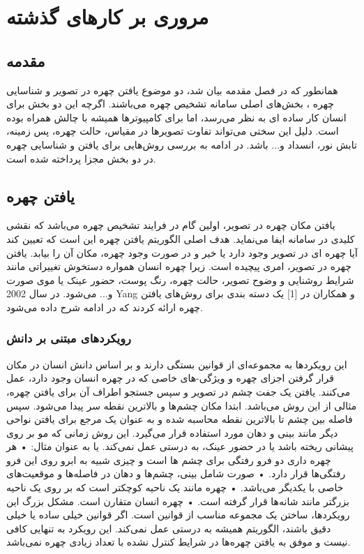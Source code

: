 \chapter{ مروری بر کارهای گذشته}

\section{مقدمه}
همانطور که در فصل مقدمه بیان شد، دو موضوع یافتن چهره  در تصویر و شناسایی چهره ، بخش‌های اصلی سامانه تشخیص چهره می‌باشند. اگرچه این دو بخش برای انسان کار ساده ای به نظر می‌رسد، اما برای کامپیوتر‌ها همیشه با چالش همراه بوده است. دلیل این سختی می‌تواند تفاوت تصویرها در مقیاس، حالت چهره، پس زمینه، تابش نور، انسداد و... باشد. در ادامه به بررسی روش‌هایی برای یافتن و شناسایی چهره در دو بخش مجزا پرداخته شده است.
\section{یافتن چهره}
یافتن مکان چهره در تصویر، اولین گام در فرایند تشخیص چهره می‌باشد که نقشی کلیدی در سامانه ایفا می‌نماید. هدف اصلی الگوریتم‌ یافتن چهره این است که تعیین کند آیا چهره ای در تصویر وجود دارد یا خیر و در صورت وجود چهره، مکان آن را بیابد. یافتن چهره در تصویر، امری پیچیده است. زیرا چهره انسان همواره دستخوش تغییراتی مانند شرایط روشنایی و وضوح تصویر، حالت چهره، رنگ پوست، حضور عینک یا موی صورت و... می‌شود. در سال 2002 Yang و همکاران در [1] یک دسته بندی برای روش‌های یافتن چهره ارائه کردند که در ادامه شرح داده می‌شود.

\subsection{رویکردهای مبتنی بر دانش}
این رویکردها به مجموعه‌ای از قوانین بستگی دارند و بر اساس دانش انسان در مکان قرار گرفتن اجزای چهره و ویژگی-های خاصی که در چهره انسان وجود دارد، عمل می‌کنند. یافتن یک جفت چشم در تصویر و سپس جستجو اطراف آن برای یافتن چهره، مثالی از این روش می‌باشد. ابتدا مکان چشم‌ها و بالاترین نقطه سر پیدا می‌شود. سپس فاصله بین چشم تا بالاترین نقطه محاسبه شده و به عنوان یک مرجع برای یافتن نواحی دیگر مانند بینی و دهان مورد استفاده قرار می‌گیرد. این روش زمانی که مو بر روی پیشانی ریخته باشد یا در حضور عینک، به درستی عمل نمی‌کند. یا به عنوان مثال:
•	هر چهره داری دو فرو رفتگی برای چشم ها است و چیزی شبیه به ابرو روی این فرو رفتگی‌ها قرار دارد.
•	صورت شامل بینی، چشم‌ها و دهان در فاصله‌ها و موقعیت‌های خاصی با یکدیگر می‌باشد.
•	چهره مانند یک ناحیه کوچکتر است که بر روی یک ناحیه بزرگتر مانند شانه‌ها قرار گرفته است. 
•	چهره انسان متقارن است.
مشکل بزرگ این رویکرد‌ها، ساختن یک مجموعه مناسب از قوانین است. اگر قوانین خیلی ساده یا خیلی دقیق باشند، الگوریتم همیشه به درستی عمل نمی‌کند. این رویکرد به تنهایی کافی نیست و موفق به یافتن چهره‌ها در شرایط کنترل نشده با تعداد زیادی چهره نمی‌باشد.

